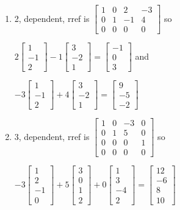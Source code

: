 \begin{multicols}{2}
\begin{enumerate}
\begin{enumerate}
	\item 2, dependent, rref is 
$
\begin{bmatrix}
 1 & 0 & 2 & -3 \\
 0 & 1 & -1 & 4 \\
 0 & 0 & 0 & 0
\end{bmatrix}
$ so

$
2\begin{bmatrix}
 1 \\
 -1  \\
 2 
\end{bmatrix}
-1\begin{bmatrix}
  3  \\
  -2  \\
  1 
\end{bmatrix}
=\begin{bmatrix}
-1  \\
0  \\
3 
\end{bmatrix}
$ and

$
-3\begin{bmatrix}
 1 \\
 -1  \\
 2 
\end{bmatrix}
+4\begin{bmatrix}
  3  \\
  -2  \\
  1 
\end{bmatrix}
=\begin{bmatrix}
9 \\
-5 \\
-2
\end{bmatrix}
$


	\item 3, dependent, rref is 
$
\begin{bmatrix}
 1 & 0 & -3 & 0 \\
 0 & 1 & 5 & 0 \\
 0 & 0 & 0 & 1 \\
 0 & 0 & 0 & 0
\end{bmatrix}
$ so 

$-3
\begin{bmatrix}
 1\\
 2\\
 -1\\
 0
\end{bmatrix}
+5
\begin{bmatrix}
3  \\
0 \\
1 \\
2 
\end{bmatrix}
+0
\begin{bmatrix}
 1 \\
3 \\
-4 \\
2
\end{bmatrix}
=
\begin{bmatrix}
 12 \\
 -6 \\
 8 \\
 10
\end{bmatrix}
$


\end{enumerate}
\end{enumerate}
\end{multicols}
